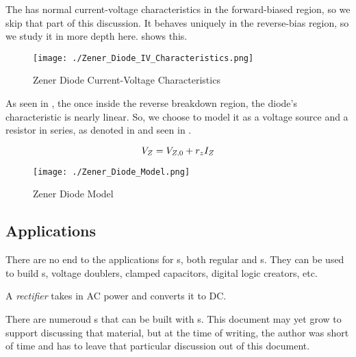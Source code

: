 The  has normal current-voltage characteristics in the forward-biased region, so we skip that part of this discussion.
It behaves uniquely in the reverse-bias region, so we study it in more depth here.
 shows this.

\begin{figure}[h!tbp]
  \centering
  \texttt{[image: ./Zener\_Diode\_IV\_Characteristics.png]}
  \caption{Zener Diode Current-Voltage Characteristics \parencite[p.~203]{sedraTextbook7}}
  \label{fig:Zener_Diode_IV_Characteristics}
\end{figure}

As seen in , the once inside the reverse breakdown region, the diode's characteristic is nearly linear.
So, we choose to model it as a voltage source and a resistor in series, as denoted in  and seen in .

\begin{equation}\label{eq:Zener_Diode_Model}
  V_{Z} = V_{Z,0} + r_{z} I_{Z}
\end{equation}

\begin{figure}[h!tbp]
  \centering
  \texttt{[image: ./Zener\_Diode\_Model.png]}
  \caption{Zener Diode Model \parencite[p.~204]{sedraTextbook7}}
  \label{fig:Zener_Diode_Model}
\end{figure}

\subsection{Applications}\label{subsec:Diode_Applications}
There are no end to the applications for s, both regular and s.
They can be used to build s, voltage doublers, clamped capacitors, digital logic creators, etc.

\begin{definition}[Rectifier]\label{def:Rectifier}
  A \emph{rectifier} takes in AC power and converts it to DC.\@
\end{definition}

There are numeroud s that can be built with s.
This document may yet grow to support discussing that material, but at the time of writing, the author was short of time and has to leave that particular discussion out of this document.

